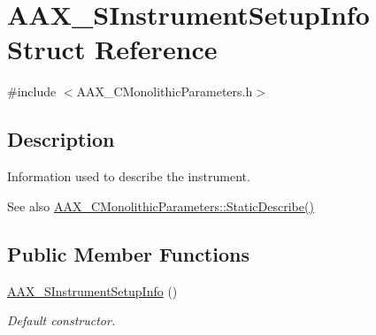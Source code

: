 \hypertarget{a00124}{}\section{A\+A\+X\+\_\+\+S\+Instrument\+Setup\+Info Struct Reference}
\label{a00124}


{\ttfamily \#include $<$A\+A\+X\+\_\+\+C\+Monolithic\+Parameters.\+h$>$}



\subsection{Description}
Information used to describe the instrument. 

\begin{DoxySeeAlso}{See also}
\hyperlink{a00026_a69f9b80a70ecc6b7b2a7eec372d2502a}{A\+A\+X\+\_\+\+C\+Monolithic\+Parameters\+::\+Static\+Describe()} 
\end{DoxySeeAlso}
\subsection*{Public Member Functions}
\begin{DoxyCompactItemize}
\item 
\hyperlink{a00124_ac5626759986bbe38a6bc9790861c1591}{A\+A\+X\+\_\+\+S\+Instrument\+Setup\+Info} ()
\begin{DoxyCompactList}\small\item\em Default constructor. \end{DoxyCompactList}\end{DoxyCompactItemize}
